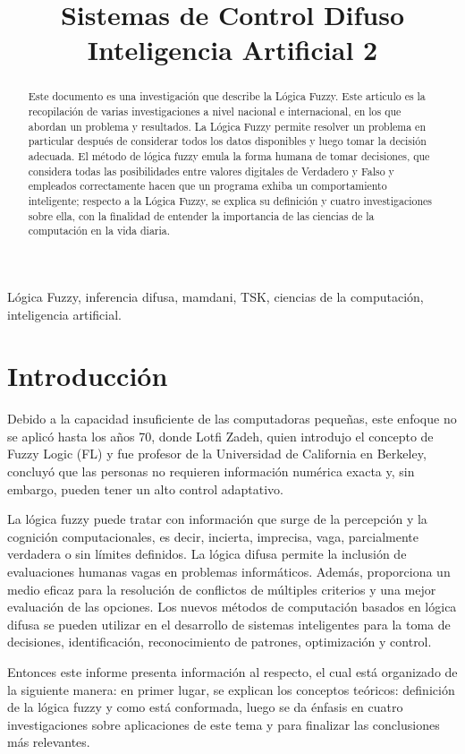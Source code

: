 \documentclass[10pt,conference]{IEEEtran}
\title{Sistemas de Control Difuso \\ {\Large Inteligencia Artificial 2}}
\author{
\IEEEauthorblockN{1\textsuperscript{do} Angely Mendez}
\IEEEauthorblockA{\textit{Escuela de Informática} \\
\textit{Universidad Nacional de Trujillo}\\
Trujillo, Perú \\
t052701020@unitru.edu.pe}
\and
\IEEEauthorblockN{2\textsuperscript{ero} Ciara Mendez}
\IEEEauthorblockA{\textit{Escuela de Informática} \\
\textit{Universidad Nacional de Trujillo}\\
Trujillo, Perú \\
t022700920@unitru.edu.pe}
}
\begin{document}
\renewcommand{\IEEEkeywordsname}{{\bfseries Palabras claves:}} %

\maketitle
\begin{abstract}
Este documento es una investigación que describe la Lógica Fuzzy. Este articulo es la recopilación de varias investigaciones a nivel nacional e internacional, en los que abordan un problema y resultados. La Lógica Fuzzy permite resolver un problema en particular después de considerar todos los datos disponibles y luego tomar la decisión adecuada. El método de lógica fuzzy emula la forma humana de tomar decisiones, que considera todas las posibilidades entre valores digitales de Verdadero y Falso y empleados correctamente hacen que un programa exhiba un comportamiento inteligente; respecto a la Lógica Fuzzy, se explica su definición y cuatro investigaciones sobre ella, con la finalidad de entender la importancia de las ciencias de la computación en la vida diaria.  
\end{abstract}

\begin{IEEEkeywords}
Lógica Fuzzy, inferencia difusa, mamdani, TSK, ciencias de la computación, inteligencia artificial.
\end{IEEEkeywords}

\section{\textbf{Introducción}}
Debido a la capacidad insuficiente de las computadoras pequeñas, este enfoque no se aplicó hasta los años 70, donde Lotfi Zadeh, quien introdujo el concepto de Fuzzy Logic (FL) y fue profesor de la Universidad de California en Berkeley, concluyó que las personas no requieren información numérica exacta y, sin embargo, pueden tener un alto control adaptativo.\par 
La lógica fuzzy puede tratar con información que surge de la percepción y la cognición computacionales, es decir, incierta, imprecisa, vaga, parcialmente verdadera o sin límites definidos. La lógica difusa permite la inclusión de evaluaciones humanas vagas en problemas informáticos. Además, proporciona un medio eficaz para la resolución de conflictos de múltiples criterios y una mejor evaluación de las opciones. Los nuevos métodos de computación basados en lógica difusa se pueden utilizar en el desarrollo de sistemas inteligentes para la toma de decisiones, identificación, reconocimiento de patrones, optimización y control. \par 
Entonces este informe presenta información al respecto, el cual está organizado de la siguiente manera: en primer lugar, se explican los conceptos teóricos: definición de la lógica fuzzy y como está conformada, luego se da énfasis en cuatro investigaciones sobre aplicaciones de este tema y para finalizar las conclusiones más relevantes.
\end{document}
